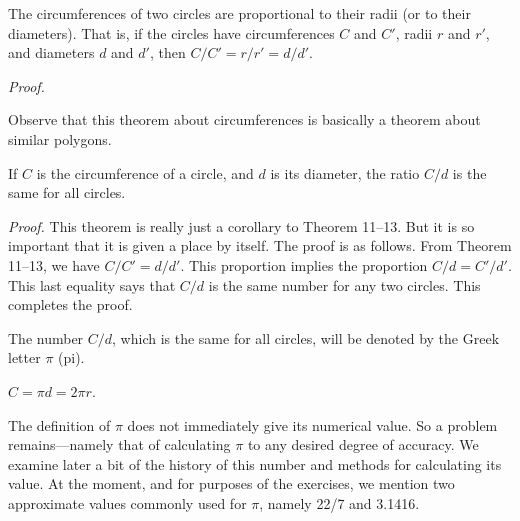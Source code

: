\documentclass[11pt]{book}
\theoremstyle{bkplain}
\theoremstyle{XIplainnote}
\theoremstyle{bkplain}
\theoremstyle{bkplain}
\begin{document}
\begin{theorem}
The circumferences of two circles are proportional to their radii (or to their
diameters). That is, if the circles have circumferences $C$ and $C'$, radii $r$
and $r'$, and diameters $d$ and $d'$, then $C/C' = r/r' = d/d'$.
\end{theorem}

\noindent\emph{Proof.}
\begin{steps}
\end{steps}

\begin{remark}
Observe that this theorem about circumferences is basically a theorem about
similar polygons.
\end{remark}

\begin{theorem}
If $C$ is the circumference of a circle, and $d$ is its diameter, the ratio
$C/d$ is the same for all circles.
\end{theorem}

\noindent\emph{Proof.} This theorem is really just a corollary to Theorem
11--13. But it is so important that it is given a place by itself. The proof is
as follows. From Theorem 11--13, we have $C/C' = d/d'$. This proportion implies
the proportion $C/d = C'/d'$. This last equality says that $C/d$ is the same
number for any two circles. This completes the proof.

\begin{definition}
The number $C/d$, which is the same for all circles, will be denoted by the
Greek letter $\pi$ (pi).
\end{definition}

\begin{corollary}
$C = \pi d = 2\pi r$.
\end{corollary}

\begin{remark}
The definition of $\pi$ does not immediately give its numerical
value. So a problem remains---namely that of calculating $\pi$ to any desired
degree of accuracy. We examine later a bit of the history of this number and
methods for calculating its value. At the moment, and for purposes of the
exercises, we mention two approximate values commonly used for $\pi$, namely
22/7 and 3.1416.
\end{remark}
\end{document}
